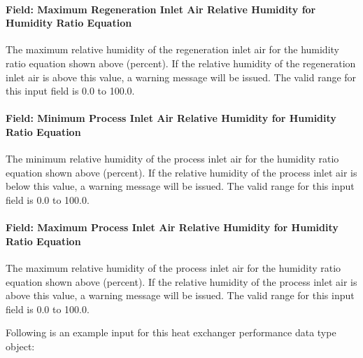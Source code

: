 \paragraph{Field: Maximum Regeneration Inlet Air Relative Humidity for Humidity Ratio Equation}\label{field-maximum-regeneration-inlet-air-relative-humidity-for-humidity-ratio-equation}

The maximum relative humidity of the regeneration inlet air for the humidity ratio equation shown above (percent). If the relative humidity of the regeneration inlet air is above this value, a warning message will be issued. The valid range for this input field is 0.0 to 100.0.

\paragraph{Field: Minimum Process Inlet Air Relative Humidity for Humidity Ratio Equation}\label{field-minimum-process-inlet-air-relative-humidity-for-humidity-ratio-equation}

The minimum relative humidity of the process inlet air for the humidity ratio equation shown above (percent). If the relative humidity of the process inlet air is below this value, a warning message will be issued. The valid range for this input field is 0.0 to 100.0.

\paragraph{Field: Maximum Process Inlet Air Relative Humidity for Humidity Ratio Equation}\label{field-maximum-process-inlet-air-relative-humidity-for-humidity-ratio-equation}

The maximum relative humidity of the process inlet air for the humidity ratio equation shown above (percent). If the relative humidity of the process inlet air is above this value, a warning message will be issued. The valid range for this input field is 0.0 to 100.0.

Following is an example input for this heat exchanger performance data type object:

